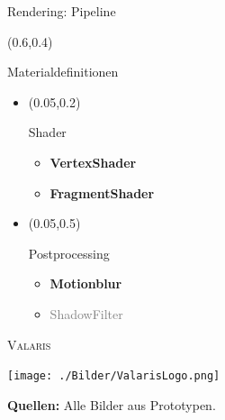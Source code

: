\documentclass[10pt]{beamer}
\begin{document}
\begin{frame}[fragile]{Rendering: Pipeline}
    \setlength{\TPHorizModule}{\textwidth}
    \setlength{\TPVertModule}{\textwidth}

    \begin{textblock}{0.35}(0.6,0.4)
        \begin{block}{Materialdefinitionen}
        \mbox{}
        \end{block}
    \end{textblock}
    \begin{itemize}
    \item \begin{textblock}{0.5}(0.05,0.2)
            \begin{block}{Shader}
                \begin{itemize}
                    \item \textbf{VertexShader}
                    \item \textbf{FragmentShader}
                \end{itemize}
            \end{block}
        \end{textblock}
    \item \begin{textblock}{0.5}(0.05,0.5)
            \begin{block}{Postprocessing}
                \begin{itemize}
                    \item \textbf{Motionblur}
                    \item \textcolor{gray}{ShadowFilter}
                \end{itemize}
            \end{block}
        \end{textblock}
    \end{itemize}
\end{frame}


\begin{frame}

    \centering
        {\scshape\LARGE Valaris \par}
    
    \vspace{1cm}

    \texttt{[image: ./Bilder/ValarisLogo.png]}

    \vspace{1cm}
    
    \tiny{\textbf{Quellen:} Alle Bilder aus Prototypen.}

\end{frame}
\end{document}
